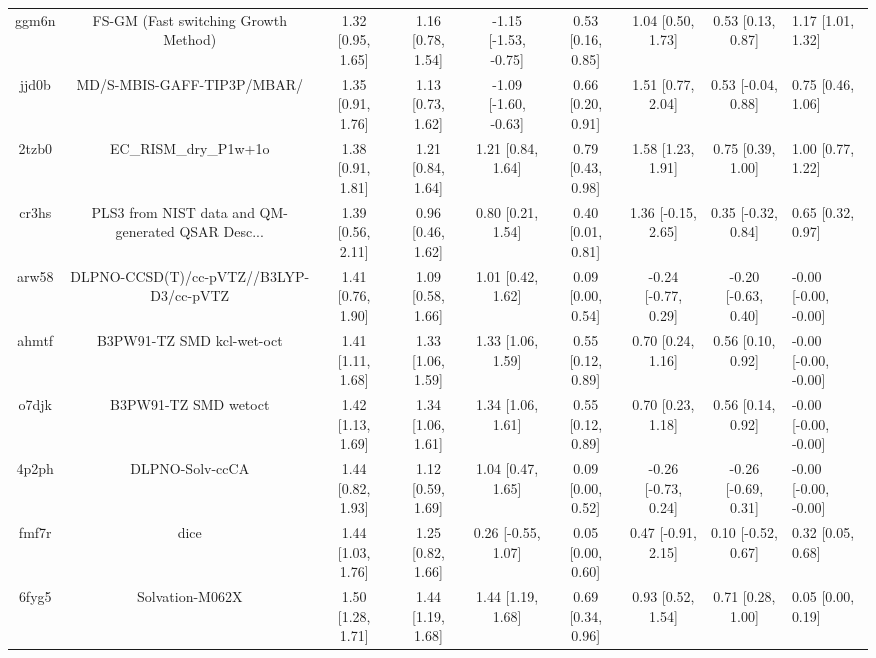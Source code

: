 \documentclass{article}
\begin{document}
\begin{center}
\begin{longtable}{|cccccccc|}
 ggm6n &               FS-GM (Fast switching Growth Method) &  1.32 [0.95, 1.65] &  1.16 [0.78, 1.54] &  -1.15 [-1.53, -0.75] &  0.53 [0.16, 0.85] &    1.04 [0.50, 1.73] &    0.53 [0.13, 0.87] &     1.17 [1.01, 1.32] \\
 jjd0b &                         MD/S-MBIS-GAFF-TIP3P/MBAR/ &  1.35 [0.91, 1.76] &  1.13 [0.73, 1.62] &  -1.09 [-1.60, -0.63] &  0.66 [0.20, 0.91] &    1.51 [0.77, 2.04] &   0.53 [-0.04, 0.88] &     0.75 [0.46, 1.06] \\
 2tzb0 &                              EC\_RISM\_dry\_P1w+1o &  1.38 [0.91, 1.81] &  1.21 [0.84, 1.64] &     1.21 [0.84, 1.64] &  0.79 [0.43, 0.98] &    1.58 [1.23, 1.91] &    0.75 [0.39, 1.00] &     1.00 [0.77, 1.22] \\
 cr3hs &  PLS3 from NIST data and QM-generated QSAR Desc... &  1.39 [0.56, 2.11] &  0.96 [0.46, 1.62] &     0.80 [0.21, 1.54] &  0.40 [0.01, 0.81] &   1.36 [-0.15, 2.65] &   0.35 [-0.32, 0.84] &     0.65 [0.32, 0.97] \\
 arw58 &            DLPNO-CCSD(T)/cc-pVTZ//B3LYP-D3/cc-pVTZ &  1.41 [0.76, 1.90] &  1.09 [0.58, 1.66] &     1.01 [0.42, 1.62] &  0.09 [0.00, 0.54] &  -0.24 [-0.77, 0.29] &  -0.20 [-0.63, 0.40] &  -0.00 [-0.00, -0.00] \\
 ahmtf &                          B3PW91-TZ SMD kcl-wet-oct &  1.41 [1.11, 1.68] &  1.33 [1.06, 1.59] &     1.33 [1.06, 1.59] &  0.55 [0.12, 0.89] &    0.70 [0.24, 1.16] &    0.56 [0.10, 0.92] &  -0.00 [-0.00, -0.00] \\
 o7djk &                               B3PW91-TZ SMD wetoct &  1.42 [1.13, 1.69] &  1.34 [1.06, 1.61] &     1.34 [1.06, 1.61] &  0.55 [0.12, 0.89] &    0.70 [0.23, 1.18] &    0.56 [0.14, 0.92] &  -0.00 [-0.00, -0.00] \\
 4p2ph &                                    DLPNO-Solv-ccCA &  1.44 [0.82, 1.93] &  1.12 [0.59, 1.69] &     1.04 [0.47, 1.65] &  0.09 [0.00, 0.52] &  -0.26 [-0.73, 0.24] &  -0.26 [-0.69, 0.31] &  -0.00 [-0.00, -0.00] \\
 fmf7r &                                               dice &  1.44 [1.03, 1.76] &  1.25 [0.82, 1.66] &    0.26 [-0.55, 1.07] &  0.05 [0.00, 0.60] &   0.47 [-0.91, 2.15] &   0.10 [-0.52, 0.67] &     0.32 [0.05, 0.68] \\
 6fyg5 &                                    Solvation-M062X &  1.50 [1.28, 1.71] &  1.44 [1.19, 1.68] &     1.44 [1.19, 1.68] &  0.69 [0.34, 0.96] &    0.93 [0.52, 1.54] &    0.71 [0.28, 1.00] &     0.05 [0.00, 0.19] \\

\end{longtable}
\end{center}
\end{document}
